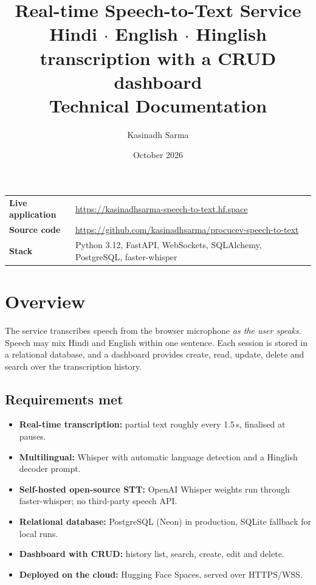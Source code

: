 \documentclass[11pt,a4paper]{article}
\title{\textbf{Real-time Speech-to-Text Service}\\[4pt]
\large Hindi $\cdot$ English $\cdot$ Hinglish transcription with a CRUD dashboard\\[2pt]
\normalsize Technical Documentation}
\author{Kasinadh Sarma}
\date{October 2026}
\begin{document}
\maketitle
\thispagestyle{empty}

\begin{center}
\begin{tabular}{@{}ll@{}}
\textbf{Live application} & \url{https://kasinadhsarma-speech-to-text.hf.space}\\
\textbf{Source code} & \url{https://github.com/kasinadhsarma/procucev-speech-to-text}\\
\textbf{Stack} & Python 3.12, FastAPI, WebSockets, SQLAlchemy, PostgreSQL, faster-whisper
\end{tabular}
\end{center}

\tableofcontents
\newpage

\section{Overview}
The service transcribes speech from the browser microphone \emph{as the user speaks}. Speech may mix
Hindi and English within one sentence. Each session is stored in a relational database, and a
dashboard provides create, read, update, delete and search over the transcription history.

\subsection*{Requirements met}
\begin{itemize}[leftmargin=*]
  \item \textbf{Real-time transcription:} partial text roughly every 1.5\,s, finalised at pauses.
  \item \textbf{Multilingual:} Whisper with automatic language detection and a Hinglish decoder prompt.
  \item \textbf{Self-hosted open-source STT:} OpenAI Whisper weights run through faster-whisper; no third-party speech API.
  \item \textbf{Relational database:} PostgreSQL (Neon) in production, SQLite fallback for local runs.
  \item \textbf{Dashboard with CRUD:} history list, search, create, edit and delete.
  \item \textbf{Deployed on the cloud:} Hugging Face Spaces, served over HTTPS/WSS.
\end{itemize}
\end{document}
